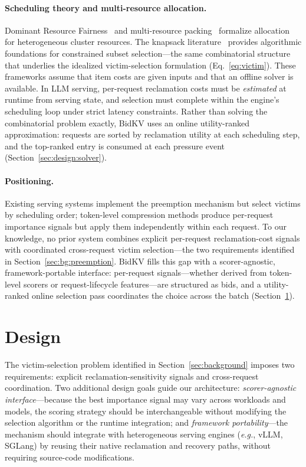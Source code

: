 \documentclass[sigconf,nonacm]{acmart}
\newcommand{\bidkv}{BidKV\xspace}
\newcommand{\eg}{\emph{e.g.},\xspace}
\begin{document}
\paragraph{Scheduling theory and multi-resource allocation.}
Dominant Resource Fairness~\cite{Ghodsi2011} and multi-resource
packing~\cite{Grandl2014} formalize allocation for heterogeneous cluster
resources.
The knapsack literature~\cite{Martello1990, Kellerer2004} provides algorithmic
foundations for constrained subset selection---the same combinatorial structure
that underlies the idealized victim-selection formulation (Eq.~\ref{eq:victim}).
These frameworks assume that item costs are given inputs and that an offline
solver is available.  In LLM serving, per-request reclamation costs must be
\emph{estimated} at runtime from serving state, and selection must complete
within the engine's scheduling loop under strict latency constraints.  Rather
than solving the combinatorial problem exactly, \bidkv uses an online
utility-ranked approximation: requests are sorted by reclamation utility at
each scheduling step, and the top-ranked entry is consumed at each pressure
event (Section~\ref{sec:design:solver}).

\paragraph{Positioning.}
Existing serving systems implement the preemption mechanism but select victims
by scheduling order; token-level compression methods produce per-request
importance signals but apply them independently within each request.
To our knowledge, no prior system combines explicit per-request
reclamation-cost signals with coordinated cross-request victim
selection---the two requirements identified in
Section~\ref{sec:bg:preemption}.
\bidkv fills this gap with a scorer-agnostic, framework-portable interface:
per-request signals---whether derived from token-level scorers or
request-lifecycle features---are structured as bids, and a utility-ranked
online selection pass coordinates the choice across the batch
(Section~\ref{sec:design}).

\section{Design}\label{sec:design}

The victim-selection problem identified in Section~\ref{sec:background}
imposes two requirements: explicit reclamation-sensitivity signals and
cross-request coordination.  Two additional design goals guide our architecture:
\emph{scorer-agnostic interface}---because the best importance signal may vary
across workloads and models, the scoring strategy should be interchangeable
without modifying the selection algorithm or the runtime integration; and
\emph{framework portability}---the mechanism should integrate with heterogeneous
serving engines (\eg vLLM, SGLang) by reusing their native reclamation and
recovery paths, without requiring source-code modifications.
\end{document}
